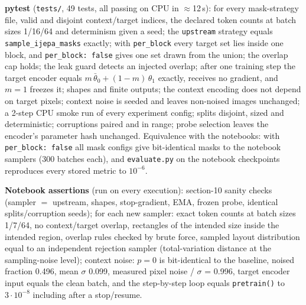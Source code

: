 \textbf{pytest} (\texttt{tests/}, 49 tests, all passing on CPU in $\approx$12\,s): for every mask-strategy file, valid and
disjoint context/target indices, the declared token counts at batch sizes 1/16/64 and determinism given a seed; the
\texttt{upstream} strategy equals \texttt{sample\_ijepa\_masks} exactly; with \texttt{per\_block} every target set lies inside one block, and \texttt{per\_block: false}
gives one set drawn from the union; the overlap cap holds;
the leak guard detects an injected overlap; after one training step the target encoder equals
$m\,\bar\theta_0+(1-m)\,\theta_1$ exactly, receives no gradient, and $m{=}1$ freezes it; shapes and finite outputs; the
context encoding does not depend on target pixels; context noise is seeded and leaves non-noised images unchanged;
a 2-step CPU smoke run of every experiment config; splits disjoint, sized and deterministic; corruptions paired and in
range; probe selection leaves the encoder's parameter hash unchanged. Equivalence with the notebooks: with \texttt{per\_block: false} all mask
configs give bit-identical masks to the notebook samplers (300 batches each), and \texttt{evaluate.py} on the
notebook checkpoints reproduces every stored metric to $10^{-6}$.

\textbf{Notebook assertions} (run on every execution): section-10 sanity checks (sampler $=$ upstream, shapes, stop-gradient,
EMA, frozen probe, identical splits/corruption seeds); for each new sampler: exact token counts at batch sizes 1/7/64, no
context/target overlap, rectangles of the intended size inside the intended region, overlap rules checked by brute force,
sampled layout distribution equal to an independent rejection sampler (total-variation distance at the sampling-noise
level); context noise: $p{=}0$ is bit-identical to the baseline, noised fraction 0.496, mean $\sigma$ 0.099, measured
pixel noise / $\sigma$ = 0.996, target encoder input equals the clean batch, and the step-by-step loop equals
\texttt{pretrain()} to $3{\cdot}10^{-8}$ including after a stop/resume.
